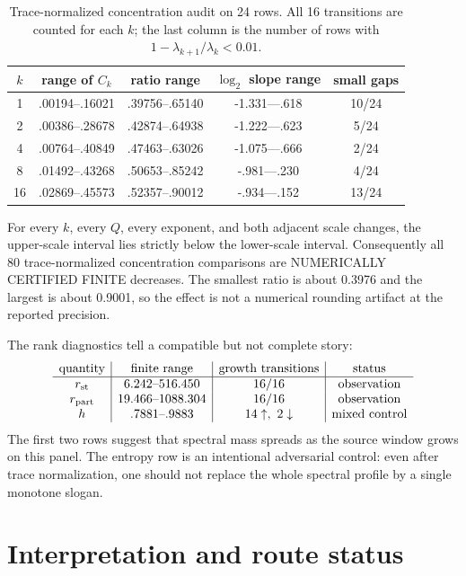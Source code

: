 \documentclass[10pt]{article}
\begin{document}
\begin{table}[t]
\centering
\small
\caption{Trace-normalized concentration audit on 24 rows.  All 16 transitions
are counted for each $k$; the last column is the number of rows with
$1-\lambda_{k+1}/\lambda_k<0.01$.}
\label{tab:concentration}
\begin{tabular}{c c c c c}
\toprule
$k$ & range of $C_k$ & ratio range & $\log_2$ slope range & small gaps\\
\midrule
1  & .00194--.16021 & .39756--.65140 & -1.331---.618 & 10/24\\
2  & .00386--.28678 & .42874--.64938 & -1.222---.623 & 5/24\\
4  & .00764--.40849 & .47463--.63026 & -1.075---.666 & 2/24\\
8  & .01492--.43268 & .50653--.85242 & -.981---.230 & 4/24\\
16 & .02869--.45573 & .52357--.90012 & -.934---.152 & 13/24\\
\bottomrule
\end{tabular}
\end{table}

For every $k$, every $Q$, every exponent, and both adjacent scale changes,
the upper-scale interval lies strictly below the lower-scale interval.
Consequently all 80 trace-normalized concentration comparisons are
NUMERICALLY CERTIFIED FINITE decreases.  The smallest ratio is about
0.3976 and the largest is about 0.9001, so the effect is not a numerical
rounding artifact at the reported precision.

The rank diagnostics tell a compatible but not complete story:
\[
\begin{array}{c|c|c|c}
\text{quantity} & \text{finite range} & \text{growth transitions}
 & \text{status}\\ \hline
r_{\rm st} & 6.242\text{--}516.450 & 16/16 & \text{observation}\\
r_{\rm part} & 19.466\text{--}1088.304 & 16/16 & \text{observation}\\
h & .7881\text{--}.9883 & 14\uparrow,\ 2\downarrow & \text{mixed control}
\end{array}
\]
The first two rows suggest that spectral mass spreads as the source window
grows on this panel.  The entropy row is an intentional adversarial control:
even after trace normalization, one should not replace the whole spectral
profile by a single monotone slogan.

\section{Interpretation and route status}
\end{document}
